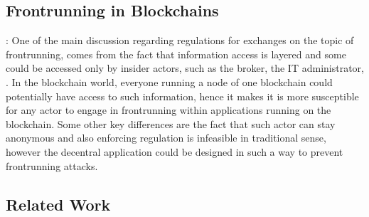 



\subsection{Frontrunning in Blockchains}: One of the main discussion regarding regulations for exchanges on the topic of frontrunning, comes from the fact that information access is layered and some could be accessed only by insider actors, such as the broker, the IT administrator, \etc. In the blockchain world, everyone running a node of one blockchain could potentially have access to such information, hence it makes it is more susceptible for any actor to engage in frontrunning within applications running on the blockchain. Some other key differences are the fact that such actor can stay anonymous and also enforcing regulation is infeasible in traditional sense, however the decentral application could be designed in such a way to prevent frontrunning attacks. 



\subsection{Related Work}

~\cite{malinova2017market}
~\cite{aune2017footprints}





















